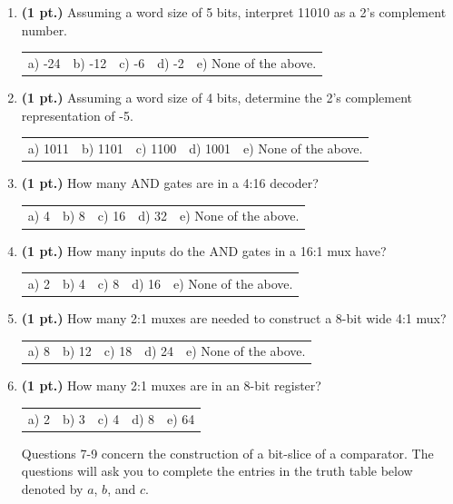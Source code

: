 \documentclass{article}
\begin{document}
\begin{enumerate}
\item {\bf (1 pt.)} Assuming a word size of 5 bits, interpret 11010 as a 2's complement
number.

\begin{tabular}{p{0.6in} p{0.6in} p{0.6in} p{0.6in} l}
a) -24 & b) -12 & c) -6 & d) -2 & e) None of the above.
\end{tabular}

\item {\bf (1 pt.)} Assuming a word size of 4 bits, determine the 2's complement
representation of -5.

\begin{tabular}{p{0.6in} p{0.6in} p{0.6in} p{0.6in} l}
a) 1011 & b) 1101 & c) 1100 & d) 1001 & e) None of the above.
\end{tabular}

\item {\bf (1 pt.)} How many AND gates are in a 4:16 decoder?

\begin{tabular}{p{0.6in} p{0.6in} p{0.6in} p{0.6in} l}
a) 4 & b) 8 & c) 16 & d) 32 & e) None of the above.
\end{tabular}


\item {\bf (1 pt.)} How many inputs do the AND gates in a 16:1 mux have?

\begin{tabular}{p{0.6in} p{0.6in} p{0.6in} p{0.6in} l}
a) 2 & b) 4 & c) 8 & d) 16 & e) None of the above.
\end{tabular}

\item {\bf (1 pt.)} How many 2:1 muxes are needed to construct a 8-bit wide
4:1 mux?

\begin{tabular}{p{0.6in} p{0.6in} p{0.6in} p{0.6in} l}
a) 8 & b) 12 & c) 18 & d) 24 & e) None of the above.
\end{tabular}

\item {\bf (1 pt.)} How many 2:1 muxes are in an 8-bit register?

\begin{tabular}{p{0.6in} p{0.6in} p{0.6in} p{0.6in} l}
a) 2 & b) 3 & c) 4 & d) 8 & e) 64
\end{tabular}

\pagebreak
Questions 7-9 concern the construction of a bit-slice of a comparator.  The questions 
will ask you to complete the entries in the truth table below denoted by $a$, $b$, and
$c$.


\end{enumerate}
\end{document}

